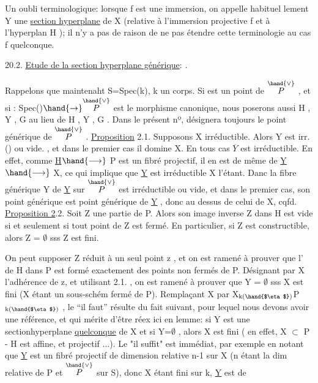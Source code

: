 
\placedmargin{$|$}Un oubli terminologique: lorsque f est une immersion, on appelle habituel%
lement Y\hand{$_\xi$} une \uline{section hyperplane} de X (relative à l'immersion projective
f et à l'hyperplan H  ); il n'y a pas de raison de ne pas étendre cette
terminologie au cas f quelconque.

20.2. \uline{Etude de la section hyperplane générique}:  .

Rappelons que maintenaht S=Spec(k), k un corps. Si \hand{$\eta$} est un point
de $\overset{\hand{\vee}}{P}$ ,  et si \hand{$\xi$}: Spec(\hand{$\eta$})$\hand{\to}\overset{\hand{\vee}}{P}$ est le morphisme canonique, nous poserons
aussi H\hand{$_\eta$} , Y\hand{$_\eta$} , G\hand{$_\eta$} au lieu de H\hand{$_\xi$} , Y\hand{$_\xi$} , G\hand{$_\xi$} . Dans le présent nº, \hand{$\eta$}
désignera toujours le point générique de $\overset{\hand{\vee}}{P}$ .
\uline{Proposition} 2.1. Supposons X irréductible. Alors Y\hand{$_\eta$} est irr. () ou vide. ,
et dans le premier cas il domine X. En tous cas $\overline{Y}$ est irréductible.
En effet, comme \uline{H}$\hand{\longrightarrow}$ P est un fibré projectif, il en est de même de
\uline{Y}$\hand{\longrightarrow}$ X, ce qui implique que \uline{Y} est irréductible X l'étant. Danc la fibre
générique Y   de \uline{Y} sur $\overset{\hand{\vee}}{P}$ est irréductible ou vide, et dans le premier cas,
son point générique est point générique de \uline{Y} , donc au dessus de celui de
X, cqfd.
\uline{Proposition 2}.2. Soit Z une partie de P. Alors son image inverse Z\hand{$_\eta$} dans
H\hand{$_\eta$} est vide si et seulement si tout point de Z est fermé. En particulier,
si Z est constructible, alors Z\hand{$_\eta$} = $\emptyset$ sss Z est fini.

On peut supposer Z réduit à un seul point z , et on est ramené à
prouver que l' de H dans P est formé exactement des points non fermés de P.
Désignant par X l'adhérence de z, et utilisant 2.1. , on est ramené à
prouver que Y\hand{$_\eta$} = $\emptyset$ sss X est  fini (X étant un sous-schém%
fermé  de P). Remplaçant X par X$_{\text{k(\hand{$\eta$})}}$\hand{$\hookrightarrow$}P$_{\text{k(\hand{$\eta$})}}$ ,  le ``il faut'' résulte du fait
\placedmargin{$|$}suivant, pour lequel nous devons avoir une référence, et qui mérite d'être
réex ici en lemme: si Y est une sectionhyperplane \uline{quelconque} de
X et si Y\hand{$_\eta$}=$\emptyset$ , alors X est fini ( en effet, X $\subset$ P - H est affine, et
projectif ...). Le "il suffit" est immédiat, par exemple en notant que
\uline{Y} est un fibré projectif de dimension relative n-1 sur X (n étant la
dim relative de P  et $\overset{\hand{\vee}}{P}$ sur S), donc X étant fini sur k, \uline{Y} est de

